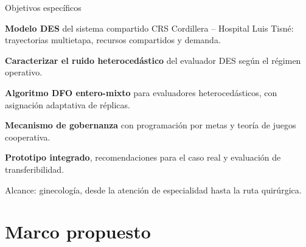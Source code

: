 \documentclass[aspectratio=169,11pt,xcolor=table]{beamer}
\begin{document}
\begin{frame}{Objetivos específicos}
  \begin{description}[OE5:]
    \item[OE1:] \textbf{Modelo DES} del sistema compartido CRS Cordillera -- Hospital
      Luis Tisné: trayectorias multietapa, recursos compartidos y demanda.
    \item[OE2:] \textbf{Caracterizar el ruido heterocedástico} del evaluador DES
      según el régimen operativo.
    \item[OE3:] \textbf{Algoritmo DFO entero-mixto} para evaluadores heterocedásticos,
      con asignación adaptativa de réplicas.
    \item[OE4:] \textbf{Mecanismo de gobernanza} con programación por metas y teoría
      de juegos cooperativa.
    \item[OE5:] \textbf{Prototipo integrado}, recomendaciones para el caso real y
      evaluación de transferibilidad.
  \end{description}
  \vfill
  {\scriptsize Alcance: ginecología, desde la atención de especialidad hasta la ruta quirúrgica.}
\end{frame}

\section{Marco propuesto}
\end{document}
